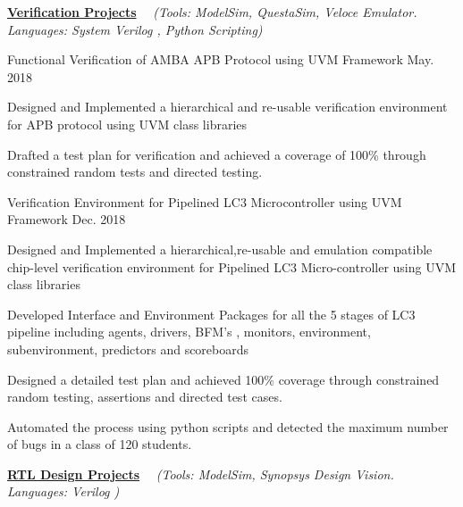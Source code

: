 \begin{flushleft}
  \par\addvspace{-1.5mm}
  \fontsize{10pt}{1em}\selectfont\underline{\textbf{\color{black}Verification Projects}} \ \ \textit{(\color{text}Tools: ModelSim, QuestaSim, Veloce Emulator.  Languages: System Verilog , Python Scripting)}
\end{flushleft}
\begin{cvprojects}
  \cvproject
    {Functional Verification of AMBA APB Protocol using UVM Framework} 
    {\color{darkgray}May. 2018}
    {
      \begin{cvprojectitems}
        \item {Designed and Implemented a hierarchical and re-usable verification environment for APB protocol using UVM class libraries}
        \item {Drafted a test plan for verification and achieved a coverage of 100\% through constrained random tests and directed testing. }
      \end{cvprojectitems}
    }
  \cvproject
    {Verification Environment for Pipelined LC3 Microcontroller using UVM Framework }
    {\color{darkgray}Dec. 2018}
    {
      \begin{cvprojectitems}
        \item {Designed and Implemented a hierarchical,re-usable and emulation compatible chip-level verification environment for Pipelined LC3 Micro-controller using UVM class libraries}
        \item {Developed Interface and Environment Packages for all the 5 stages of LC3 pipeline including agents, drivers, BFM's , monitors, environment, subenvironment, predictors and scoreboards}
        \item {Designed a detailed test plan and achieved 100\% coverage through constrained random testing, assertions and directed test cases.}
        \item {Automated the process using python scripts and detected the maximum number of bugs in a class of 120 students.}
      \end{cvprojectitems}
    }
    \par\addvspace{3ex}
    \begin{flushleft}
    \par\addvspace{-1.5mm}
    \fontsize{10pt}{1em}\selectfont\underline{\textbf{\color{black}RTL Design Projects}} \ \ \textit{(\color{text}Tools: ModelSim, Synopsys Design Vision.  Languages: Verilog )}
    \end{flushleft}

\end{cvprojects}
